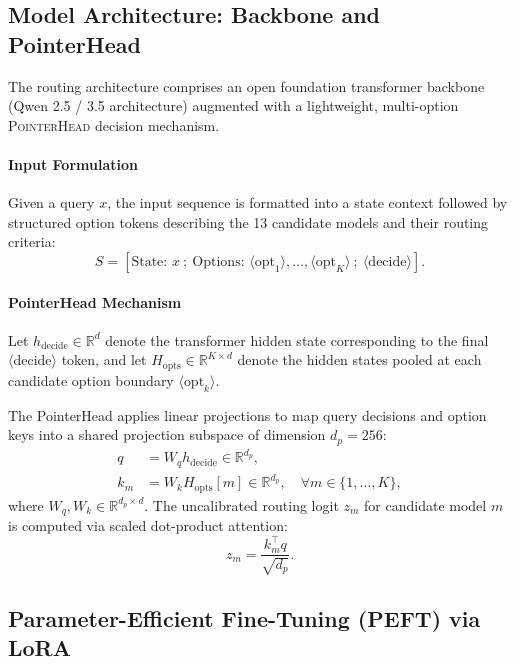 \documentclass[11pt,a4paper]{article}
\begin{document}
\subsection{Model Architecture: Backbone and PointerHead}
\label{subsec:architecture}

The routing architecture comprises an open foundation transformer backbone (Qwen 2.5 / 3.5 architecture) augmented with a lightweight, multi-option \textsc{PointerHead} decision mechanism.

\paragraph{Input Formulation}
Given a query $x$, the input sequence is formatted into a state context followed by structured option tokens describing the 13 candidate models and their routing criteria:
\begin{equation}
S = [\text{State: } x \ ; \ \text{Options: } \langle\text{opt}_1\rangle, \dots, \langle\text{opt}_K\rangle \ ; \ \langle\text{decide}\rangle].
\end{equation}

\paragraph{PointerHead Mechanism}
Let $h_{\text{decide}} \in \mathbb{R}^d$ denote the transformer hidden state corresponding to the final $\langle\text{decide}\rangle$ token, and let $H_{\text{opts}} \in \mathbb{R}^{K \times d}$ denote the hidden states pooled at each candidate option boundary $\langle\text{opt}_k\rangle$.

The PointerHead applies linear projections to map query decisions and option keys into a shared projection subspace of dimension $d_p = 256$:
\begin{align}
q &= W_q h_{\text{decide}} \in \mathbb{R}^{d_p}, \\
k_m &= W_k H_{\text{opts}}[m] \in \mathbb{R}^{d_p}, \quad \forall m \in \{1, \dots, K\},
\end{align}
where $W_q, W_k \in \mathbb{R}^{d_p \times d}$. The uncalibrated routing logit $z_m$ for candidate model $m$ is computed via scaled dot-product attention:
\begin{equation}
z_m = \frac{k_m^\top q}{\sqrt{d_p}}.
\end{equation}

\subsection{Parameter-Efficient Fine-Tuning (PEFT) via LoRA}
\label{subsec:peft_lora}
\end{document}
